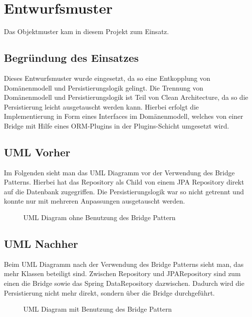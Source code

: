 
\chapter{Entwurfsmuster}
Das Objektmuster  kam in diesem Projekt zum Einsatz. 

\section{Begründung des Einsatzes}
Dieses Entwurfsmuster wurde eingesetzt, da so eine Entkopplung von Domänenmodell und Persistierungslogik gelingt. Die Trennung von Domänenmodell und Persistierungslogik ist Teil von Clean Architecture, da so die Persistierung leicht ausgetauscht werden kann. Hierbei erfolgt die Implementierung in Form eines Interfaces im Domänenmodell, welches von einer Bridge mit Hilfe eines ORM-Plugins in der Plugins-Schicht umgesetzt wird.

\section{\ac{UML} Vorher}
Im Folgenden sieht man das \ac{UML} Diagramm vor der Verwendung des Bridge Patterns. Hierbei hat das Repository als Child von einem JPA Repository direkt auf die Datenbank zugegriffen. Die Persistierungslogik war so nicht getrennt und konnte nur mit mehreren Anpassungen ausgetauscht werden.

        \begin{figure}[H]
	        \centering
	        \caption{UML Diagram ohne Benutzung des Bridge Pattern}
        \end{figure}

\section{\ac{UML} Nachher}
Beim \ac{UML} Diagramm nach der Verwendung des Bridge Patterns sieht man, das mehr Klassen beteiligt sind. Zwischen Repository und JPARepository sind zum einen die Bridge sowie das Spring DataRepository dazwischen. Dadurch wird die Persistierung nicht mehr direkt, sondern über die Bridge durchgeführt.

        \begin{figure}[H]
	        \centering
	        \caption{UML Diagram mit Benutzung des Bridge Pattern}
        \end{figure}